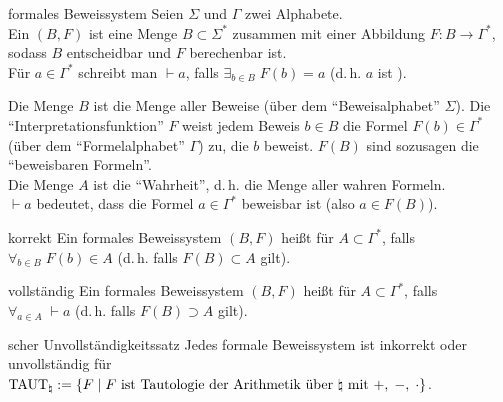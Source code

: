 \linie

\begin{Def}{formales Beweissystem}
    Seien $\Sigma$ und $\Gamma$ zwei Alphabete.\\
    Ein  $(B, F)$ ist eine Menge $B \subset \Sigma^\ast$ zusammen
    mit einer Abbildung $F\colon B \rightarrow \Gamma^\ast$, sodass $B$ entscheidbar und
    $F$ berechenbar ist.\\
    Für $a \in \Gamma^\ast$ schreibt man $\vdash a$, falls $\exists_{b \in B}\; F(b) = a$
    (d.\,h. $a$ ist ).
\end{Def}

\begin{Bem}
    Die Menge $B$ ist die Menge aller Beweise (über dem "`Beweisalphabet"' $\Sigma$).
    Die "`Interpretationsfunktion"' $F$ weist jedem Beweis $b \in B$ die Formel
    $F(b) \in \Gamma^\ast$ (über dem "`Formelalphabet"' $\Gamma$) zu, die $b$ beweist.
    $F(B)$ sind sozusagen die "`beweisbaren Formeln"'.\\
    Die Menge $A$ ist die "`Wahrheit"', d.\,h. die Menge aller wahren Formeln.\\
    $\vdash a$ bedeutet, dass die Formel $a \in \Gamma^\ast$ beweisbar ist
    (also $a \in F(B)$).
\end{Bem}

\begin{Def}{korrekt}
    Ein formales Beweissystem $(B, F)$ heißt  für $A \subset \Gamma^\ast$,
    falls\\
    $\forall_{b \in B}\; F(b) \in A$ (d.\,h. falls $F(B) \subset A$ gilt).
\end{Def}

\begin{Def}{vollständig}
    Ein formales Beweissystem $(B, F)$ heißt  für $A \subset \Gamma^\ast$,
    falls\\
    $\forall_{a \in A}\; \vdash a$ (d.\,h. falls $F(B) \supset A$ gilt).
\end{Def}

\begin{Satz}{scher Unvollständigkeitssatz}
    Jedes formale Beweissystem ist inkorrekt oder unvollständig für
    $\text{TAUT}_\natural := \{F \;|\; F \text{ ist Tautologie der Arithmetik über } \natural
    \text{ mit } +,\; -,\; \cdot\}$.
\end{Satz}

